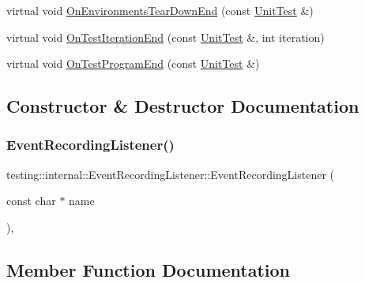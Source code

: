 \begin{DoxyCompactItemize}
\item 
virtual void \mbox{\hyperlink{classtesting_1_1internal_1_1EventRecordingListener_acd5a3dc070265166a7da68222031fd61}{On\+Environments\+Tear\+Down\+End}} (const \mbox{\hyperlink{classtesting_1_1UnitTest}{Unit\+Test}} \&)
\item 
virtual void \mbox{\hyperlink{classtesting_1_1internal_1_1EventRecordingListener_ab0cc007bcfaf06cd383d574c88f62aea}{On\+Test\+Iteration\+End}} (const \mbox{\hyperlink{classtesting_1_1UnitTest}{Unit\+Test}} \&, int iteration)
\item 
virtual void \mbox{\hyperlink{classtesting_1_1internal_1_1EventRecordingListener_a21fe9c3c519c4599a48b16ddfb734aa3}{On\+Test\+Program\+End}} (const \mbox{\hyperlink{classtesting_1_1UnitTest}{Unit\+Test}} \&)
\end{DoxyCompactItemize}


\subsection{Constructor \& Destructor Documentation}
\mbox{\label{classtesting_1_1internal_1_1EventRecordingListener_a7b0254c15d6b8468e1441ee572fee707}} 
\subsubsection{\texorpdfstring{EventRecordingListener()}{EventRecordingListener()}}
{\footnotesize\ttfamily testing\+::internal\+::\+Event\+Recording\+Listener\+::\+Event\+Recording\+Listener (\begin{DoxyParamCaption}\item[{const char $\ast$}]{name }\end{DoxyParamCaption})\hspace{0.3cm}{\ttfamily [inline]}, {\ttfamily [explicit]}}



\subsection{Member Function Documentation}
\mbox{\label{classtesting_1_1internal_1_1EventRecordingListener_a40b4c5e05abd1aa11a030f999f6adb8f}} 
